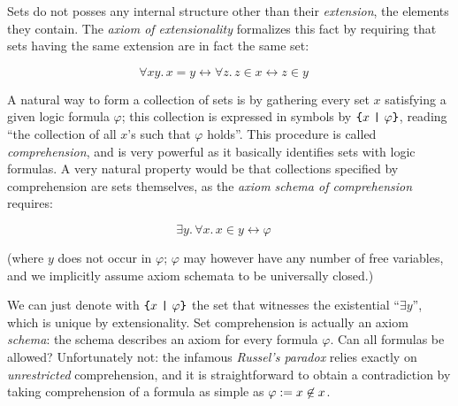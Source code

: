 \documentclass[sigplan,10pt,anonymous,review]{acmart}%
\begin{document}


Sets do not posses any internal structure other than their \emph{extension}, \ie{} the elements they contain. The \emph{axiom of extensionality} formalizes this fact by requiring that sets having the same extension are in fact the same set:

\[\forall x y.\, x = y \leftrightarrow \forall z. \, z \in x \leftrightarrow z \in y \quad \tag{\SetExt} \]

A natural way to form a collection of sets is by gathering every set $x$ satisfying a given logic formula $\varphi$; this collection is expressed in symbols by $\text{\texttt{\{}} x ~\text{\texttt{|}}~ \varphi \text{\texttt{\}}}$, reading ``the collection of all $x$'s such that $\varphi$ holds''. This procedure is called \emph{comprehension}, and is very powerful as it basically identifies sets with logic formulas.  A very natural property would be that collections specified by comprehension are sets themselves, as the \emph{axiom schema of comprehension} requires:

\[ \exists y.\, \forall x.\, x \in y \leftrightarrow \varphi  \quad \tag{\SetCompr} \]

(where $y$ does not occur in $\varphi$; $\varphi$ may however have any number of free variables, and we implicitly assume axiom schemata to be universally closed.)

We can just denote with $\text{\texttt{\{}} x ~\text{\texttt{|}}~ \varphi \text{\texttt{\}}}$ the set that witnesses the existential ``$\exists y$'', which is unique by extensionality. Set comprehension is actually an axiom \emph{schema}: the schema describes an axiom for every formula $\varphi$. Can all formulas be allowed? Unfortunately not: the infamous \emph{Russel's paradox} relies exactly on \emph{unrestricted} comprehension, and it is straightforward to obtain a contradiction by taking comprehension of a formula as simple as $\varphi := x \not\in x$.\footnotemark{}

\end{document}
